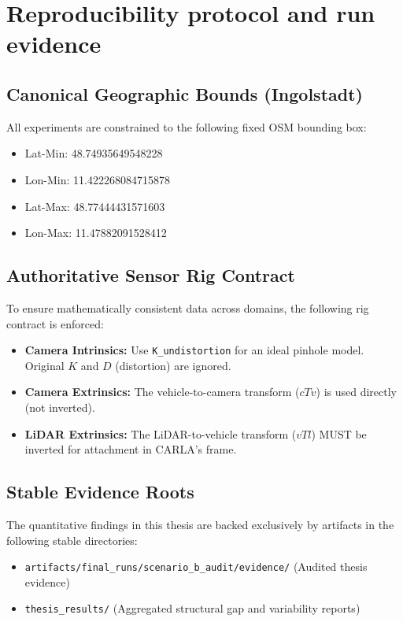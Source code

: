 
\section{Reproducibility protocol and run evidence}
\label{sec:repro_protocol}

\subsection{Canonical Geographic Bounds (Ingolstadt)}
All experiments are constrained to the following fixed OSM bounding box:
\begin{itemize}
    \item Lat-Min: 48.74935649548228
    \item Lon-Min: 11.422268084715878
    \item Lat-Max: 48.77444431571603
    \item Lon-Max: 11.47882091528412
\end{itemize}

\subsection{Authoritative Sensor Rig Contract}
To ensure mathematically consistent data across domains, the following rig contract is enforced:
\begin{itemize}
    \item \textbf{Camera Intrinsics:} Use \texttt{K\_undistortion} for an ideal pinhole model. Original $K$ and $D$ (distortion) are ignored.
    \item \textbf{Camera Extrinsics:} The vehicle-to-camera transform ($cTv$) is used directly (not inverted).
    \item \textbf{LiDAR Extrinsics:} The LiDAR-to-vehicle transform ($vTl$) MUST be inverted for attachment in CARLA's frame.
\end{itemize}

\subsection{Stable Evidence Roots}
The quantitative findings in this thesis are backed exclusively by artifacts in the following stable directories:
\begin{itemize}
    \item \texttt{artifacts/final\_runs/scenario\_b\_audit/evidence/} (Audited thesis evidence)
    \item \texttt{thesis\_results/} (Aggregated structural gap and variability reports)
\end{itemize}

